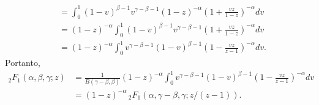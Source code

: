 \documentclass[a4paper,10pt, leqno, answers]{exam}  %
\begin{document}
\begin{questions}
\begin{parts}
\begin{solution}
\begin{align*}
                &= \int_0^1 (1 - v)^{\beta - 1} v^{\gamma - \beta - 1} (1 - z)^{-\alpha} \left( 1 + \frac{vz}{1 - z} \right)^{-\alpha} dv \\
                &= (1 - z)^{-\alpha} \int_0^1 (1 - v)^{\beta - 1} v^{\gamma - \beta - 1} \left( 1 + \frac{vz}{1 - z} \right)^{-\alpha} dv \\
                &= (1 - z)^{-\alpha} \int_0^1 v^{\gamma - \beta - 1} (1 - v)^{\beta - 1} \left( 1 - \frac{vz}{z - 1} \right)^{-\alpha} dv.
            \end{align*}
            Portanto,
            \begin{align*}
                {}_2F_1(\alpha, \beta, \gamma; z) &= \frac{1}{B(\gamma - \beta, \beta)} (1 - z)^{-\alpha} \int_0^1 v^{\gamma - \beta - 1} (1 - v)^{\beta - 1} \left( 1 - \frac{vz}{z - 1} \right)^{-\alpha} dv \\
                &= (1 - z)^{-\alpha} \,_2F_1(\alpha, \gamma - \beta, \gamma; z / (z - 1)).
            \end{align*}
        \end{solution}


\end{parts}
\end{questions}
\end{document}
